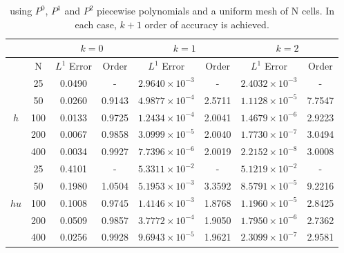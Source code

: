 \begin{center}
\begin{small}
    \begin{table}[H]
        \centering
        \begin{tabular}{c c c c c c c c }
        \toprule
            & & \multicolumn{2}{c}{$k=0$} & \multicolumn{2}{c}{$k=1$}&\multicolumn{2}{c}{$k=2$} \\
        \midrule
              & N & $L^1$ Error & Order & $L^1$ Error & Order & $L^1$ Error & Order \\
        \midrule
              & 25  & 0.0490 & -      & $2.9640 \times 10^{-3}$ & -      & $2.4032 \times 10^{-3}$ & - \\  
              & 50  & 0.0260 & 0.9143 & $4.9877 \times 10^{-4}$ & 2.5711 & $1.1128 \times 10^{-5}$ & 7.7547 \\ 
            $h$ & 100 & 0.0133 & 0.9725 & $1.2434 \times 10^{-4}$ & 2.0041 & $1.4679 \times 10^{-6}$ & 2.9223 \\ 
              & 200 & 0.0067 & 0.9858 & $3.0999 \times 10^{-5}$ & 2.0040 & $1.7730 \times 10^{-7}$ & 3.0494 \\ 
              & 400 & 0.0034 & 0.9927 & $7.7396 \times 10^{-6}$ & 2.0019 & $2.2152 \times 10^{-8}$ & 3.0008\\ 
        \midrule
              & 25  & 0.4101 & -      & $5.3311 \times 10^{-2}$ & -      & $5.1219 \times 10^{-2}$ & - \\
              & 50  & 0.1980 & 1.0504 & $5.1953 \times 10^{-3}$ & 3.3592 & $8.5791 \times 10^{-5}$ & 9.2216\\
            $hu$ & 100 & 0.1008 & 0.9745 & $1.4146 \times 10^{-3}$ & 1.8768 & $1.1960 \times 10^{-5}$ & 2.8425\\
              & 200 & 0.0509 & 0.9857 & $3.7772 \times 10^{-4}$ & 1.9050 & $1.7950 \times 10^{-6}$ & 2.7362\\
              & 400 & 0.0256 & 0.9928 & $9.6943 \times 10^{-5}$ & 1.9621 & $2.3099 \times 10^{-7}$ & 2.9581\\
        \bottomrule
        \end{tabular}        
        \caption{  using $P^0$, $P^1$ and $P^2$ piecewise polynomials and a uniform mesh of N cells. In each case, $k+1$ order of accuracy is achieved. 
        }
        \label{tab:acc}
    \end{table}
\end{small}
\end{center}





